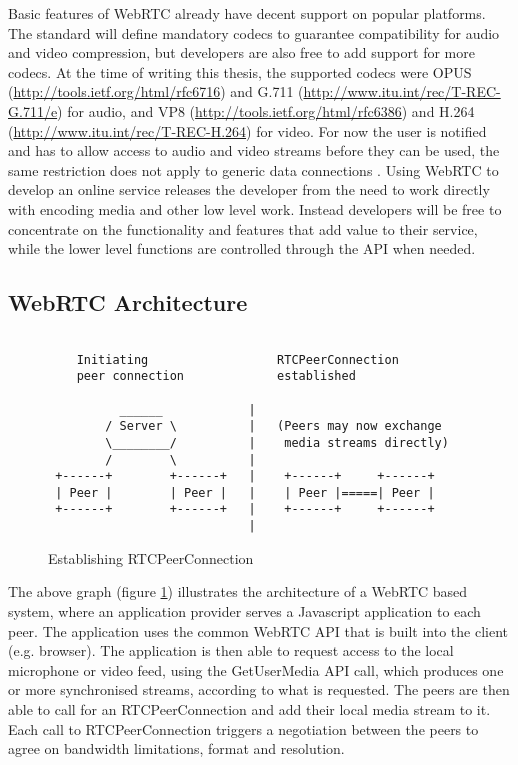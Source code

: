 \documentclass[english,12pt,a4paper,pdftex]{article}
\begin{document}
Basic features of WebRTC already have decent support on popular platforms. The standard will define mandatory codecs to guarantee compatibility for audio and video compression, but developers are also free to add support for more codecs. At the time of writing this thesis, the supported codecs were OPUS (\url{http://tools.ietf.org/html/rfc6716}) and G.711 (\url{http://www.itu.int/rec/T-REC-G.711/e}) for audio, and VP8 (\url{http://tools.ietf.org/html/rfc6386}) and H.264 (\url{http://www.itu.int/rec/T-REC-H.264}) for video. \cite{Jennings} For now the user is notified and has to allow access to audio and video streams before they can be used, the same restriction does not apply to generic data connections \cite{Johnston}. Using WebRTC to develop an online service releases the developer from the need to work directly with encoding media and other low level work. Instead developers will be free to concentrate on the functionality and features that add value to their service, while the lower level functions are controlled through the API when needed.

\subsection{WebRTC Architecture}

\begin{figure}[H]
\begin{verbatim}

    Initiating                  RTCPeerConnection
    peer connection             established
    
          ______            |
        / Server \          |   (Peers may now exchange 
        \________/          |    media streams directly)
        /        \          |
 +------+        +------+   |    +------+     +------+
 | Peer |        | Peer |   |    | Peer |=====| Peer |
 +------+        +------+   |    +------+     +------+
                            |
\end{verbatim}
\caption{Establishing RTCPeerConnection}
\label{fig:peer-connection}
\end{figure}

The above graph (figure \ref{fig:peer-connection}) illustrates the architecture of a WebRTC based system, where an application provider serves a Javascript application to each peer. The application uses the common WebRTC API that is built into the client (e.g. browser). The application is then able to request access to the local microphone or video feed, using the GetUserMedia API call, which produces one or more synchronised streams, according to what is requested. The peers are then able to call for an RTCPeerConnection and add their local media stream to it. Each call to RTCPeerConnection triggers a negotiation between the peers to agree on bandwidth limitations, format and resolution. \cite{Jennings, Garaizar}
\end{document}
